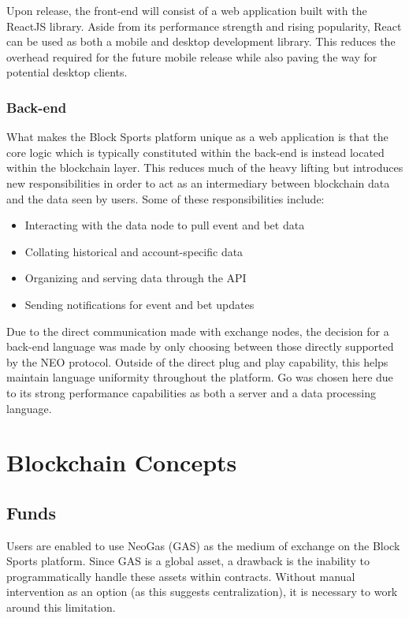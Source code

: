 \documentclass{article}
\begin{document}
Upon release, the front-end will consist of a web application built with the ReactJS library. Aside from its performance strength and rising popularity, React can be used as both a mobile and desktop development library. This reduces the overhead required for the future mobile release while also paving the way for potential desktop clients.

		\subsubsection{Back-end}
What makes the Block Sports platform unique as a web application is that the core logic which is typically constituted within the back-end is instead located within the blockchain layer. This reduces much  of the heavy lifting but introduces new responsibilities in order to act as an intermediary between blockchain data and the data seen by users. Some of these responsibilities include:

\begin{itemize}
	\item Interacting with the data node to pull event and bet data
	\item Collating historical and account-specific data
	\item Organizing and serving data through the API
	\item Sending notifications for event and bet updates
\end{itemize}

Due to the direct communication made with exchange nodes, the decision for a back-end language was made by only choosing between those directly supported by the NEO protocol. Outside of the direct plug and play capability, this helps maintain language uniformity throughout the platform. Go was chosen here due to its strong performance capabilities as both a server and a data processing language.

\section{Blockchain Concepts}
	\subsection{Funds}
Users are enabled to use NeoGas (GAS) as the medium of exchange on the Block Sports platform. Since GAS is a global asset, a drawback is the inability to programmatically handle these assets within contracts. Without manual intervention as an option (as this suggests centralization), it is necessary to work around this limitation.
\end{document}
